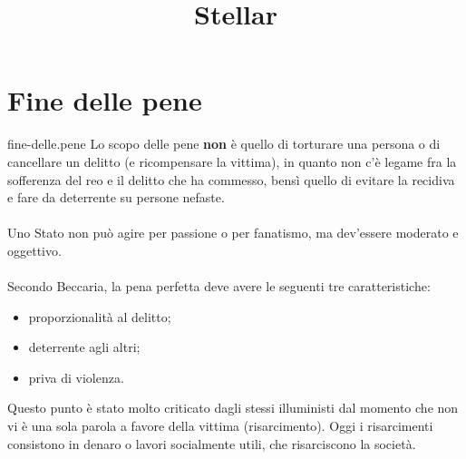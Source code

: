 \documentclass[preview]{standalone}
\begin{document}
\title{Stellar}
\genpage

\section{Fine delle pene}

\begin{snippet}{fine-delle.pene}
    Lo scopo delle pene \textbf{non} è
    quello di torturare una persona o di cancellare un delitto
    (e ricompensare la vittima), in quanto non c'è legame fra la sofferenza
    del reo e il delitto che ha commesso, bensì quello di
    evitare la recidiva e fare da deterrente su persone nefaste.
    \\\\
    Uno Stato non può agire per passione o per fanatismo, ma dev'essere moderato
    e oggettivo.
    \\\\
    Secondo Beccaria, la pena perfetta deve avere le seguenti tre caratteristiche:
    \begin{itemize}
        \item proporzionalità al delitto;
        \item deterrente agli altri;
        \item priva di violenza.
    \end{itemize}
    Questo punto è stato molto criticato dagli stessi illuministi
    dal momento che non vi è una sola parola a favore della vittima (risarcimento).
    Oggi i risarcimenti consistono in denaro o lavori socialmente utili, che risarciscono
    la società.
    
\end{snippet}
\end{document}
